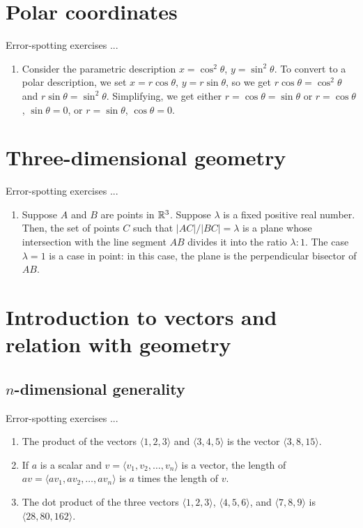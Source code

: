 \documentclass[10pt]{amsart}
\begin{document}
\section{Polar coordinates}

Error-spotting exercises ...

\begin{enumerate}
\item Consider the parametric description $x = \cos^2 \theta$, $y =
  \sin^2\theta$. To convert to a polar description, we set $x = r\cos
  \theta$, $y = r \sin \theta$, so we get $r\cos \theta =
  \cos^2\theta$ and $r\sin \theta = \sin^2\theta$. Simplifying, we get
  either $r = \cos \theta = \sin \theta$ or $r = \cos \theta$, $\sin
  \theta = 0$, or $r = \sin \theta$, $\cos \theta = 0$.
\end{enumerate}

\section{Three-dimensional geometry}

Error-spotting exercises ...

\begin{enumerate}
\item Suppose $A$ and $B$ are points in $\mathbb{R}^3$. Suppose $\lambda$ is a
  fixed positive real number. Then, the set of points $C$ such that
  $|AC|/|BC| = \lambda$ is a plane whose intersection with the line
  segment $AB$ divides it into the ratio $\lambda:1$. The case
  $\lambda = 1$ is a case in point: in this case, the plane is the
  perpendicular bisector of $AB$.
\end{enumerate}

\section{Introduction to vectors and relation with geometry}

\subsection{$n$-dimensional generality}

Error-spotting exercises ...

\begin{enumerate}
\item The product of the vectors $\langle 1,2,3 \rangle$ and $\langle
  3,4,5 \rangle$ is the vector $\langle 3,8,15\rangle$.
\item If $a$ is a scalar and $v = \langle v_1,v_2,\dots, v_n \rangle$
  is a vector, the length of $av = \langle av_1,av_2,\dots,av_n
  \rangle$ is $a$ times the length of $v$.
\item The dot product of the three vectors $\langle 1,2,3 \rangle$,
  $\langle 4,5,6 \rangle$, and $\langle 7,8,9 \rangle$ is $\langle 28,
  80, 162 \rangle$.
\end{enumerate}
\end{document}
